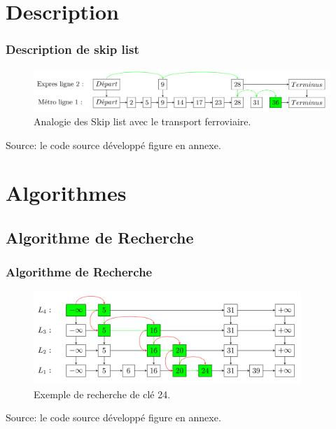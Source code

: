 \documentclass{beamer}
\begin{document}

\section[Description]{Description}
\begin{frame}
	\frametitle{Description de skip list}
	
		\begin{figure}
			\centering			
			\includegraphics[width=1\textwidth]{discription.png}
			\caption{Analogie des Skip list avec le transport ferroviaire.}		
		\end{figure}	
	
	\centering
	{\footnotesize {Source: le code source développé figure en annexe.}}			

\end{frame}	


\section[Algorithmes]{Algorithmes}
\subsection{Algorithme de Recherche}
{	
	\begin{frame}
			\frametitle{Algorithme de Recherche}				
				\begin{figure}
					\centering			
					\includegraphics[width=0.9\textwidth]{recherche.png}
					\caption{Exemple de recherche de clé 24.}
				\end{figure}
			
			\centering
			{\footnotesize {Source: le code source développé figure en annexe.}}

	\end{frame}
}
\end{document}

